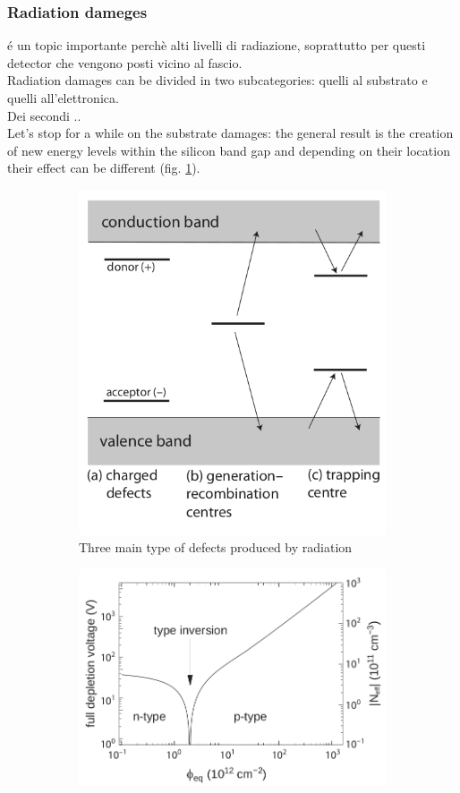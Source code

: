 \begin{titlepage}
\subsubsection{Radiation dameges}
é un topic importante perchè alti livelli di radiazione, soprattutto per questi detector che vengono posti vicino
al fascio.\\
Radiation damages can be divided in two subcategories: quelli al substrato e quelli all'elettronica.\\
Dei secondi ..\\
Let's stop for a while on the substrate damages: the general result is the creation of new energy levels
within the silicon band gap and depending on their location their effect can be different
(fig. \ref{fig:radiation_damage_scheme}).\\
\begin{figure}
   \begin{subfigure}{.5\textwidth}
     \centering
     \includegraphics[width=.8\linewidth]{figures/radiation_damage_scheme.png}
     \caption{Three main type of defects produced by radiation}
     \label{fig:radiation_damage_scheme}
   \end{subfigure}%
   \begin{subfigure}{.5\textwidth}
     \centering
     \includegraphics[width=.8\linewidth]{figures/type_inversion.png}

\end{subfigure}
\end{figure}
\end{titlepage}
